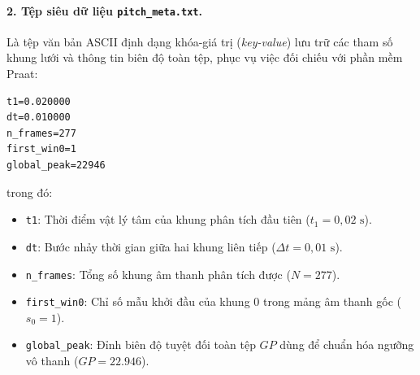 \paragraph{2. Tệp siêu dữ liệu \texttt{pitch\_meta.txt}.}
Là tệp văn bản ASCII định dạng khóa-giá trị (\emph{key-value}) lưu trữ các tham số khung lưới và thông tin biên độ toàn tệp, phục vụ việc đối chiếu với phần mềm Praat:
\begin{lstlisting}[caption={Cấu trúc mẫu của tệp siêu dữ liệu \texttt{pitch\_meta.txt}.}]
t1=0.020000
dt=0.010000
n_frames=277
first_win0=1
global_peak=22946
\end{lstlisting}
trong đó:
\begin{itemize}
    \item \texttt{t1}: Thời điểm vật lý tâm của khung phân tích đầu tiên ($t_1 = 0{,}02\text{ s}$).
    \item \texttt{dt}: Bước nhảy thời gian giữa hai khung liên tiếp ($\Delta t = 0{,}01\text{ s}$).
    \item \texttt{n\_frames}: Tổng số khung âm thanh phân tích được ($N = 277$).
    \item \texttt{first\_win0}: Chỉ số mẫu khởi đầu của khung 0 trong mảng âm thanh gốc ($s_0 = 1$).
    \item \texttt{global\_peak}: Đỉnh biên độ tuyệt đối toàn tệp $GP$ dùng để chuẩn hóa ngưỡng vô thanh ($GP = 22.946$).
\end{itemize}

